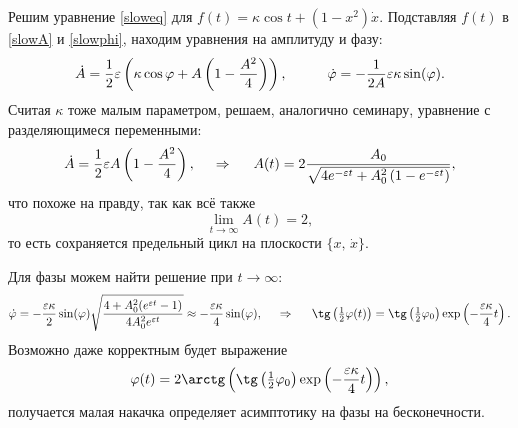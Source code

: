 Решим уравнение \eqref{sloweq} для $f(t) = \kappa \cos t + (1-x^2) \dot{x}$. Подставляя $f(t)$ в \eqref{slowA} и \eqref{slowphi}, находим
уравнения на амплитуду и фазу:
\begin{equation*}
    \dot{A} = \frac{1}{2} \varepsilon \left(\kappa \cos \varphi + A \left(1-\frac{A^2}{4}\right) \right),
    \hspace{10 mm} 
    \dot{\varphi} = - \frac{1}{2A} \varepsilon \kappa \sin(\varphi).
\end{equation*}
Считая $\kappa$ тоже малым параметром, решаем, аналогично семинару, уравнение с разделяющимеся переменными:
\begin{equation*}
    \dot{A} = \frac{1}{2}\varepsilon A \left(1 - \frac{A^2}{4}\right),
    \hspace{0.5cm} \Rightarrow \hspace{0.5cm} 
    A(t) = 2 \frac{A_0}{\sqrt{ 4 e^{-\varepsilon t} + A_0^2\left(1 -  e^{-\varepsilon t}\right)}},
\end{equation*}
что похоже на правду, так как всё также
\begin{equation*}
    \lim_{t\to \infty} A(t) = 2,
\end{equation*}
то есть сохраняется предельный цикл на плоскости $\{x,\, \dot{x}\}$. 

Для фазы можем найти решение при $t\to \infty$:
\begin{equation*}
    \dot{\varphi} = -\frac{\varepsilon \kappa}{2} \sin(\varphi) \sqrt{\frac{4 + A_0^2 (e^{\varepsilon t} - 1)}{4 A_0^2 e^{\varepsilon t}}} \approx  - \frac{\varepsilon \kappa}{4} \sin(\varphi),
    \hspace{0.5cm} \Rightarrow \hspace{0.5cm}
    \tg\left(\tfrac{1}{2}\varphi(t)\right) = \tg\left(\tfrac{1}{2}\varphi_0\right)\exp\left(- \frac{\varepsilon \kappa}{4} t\right).
\end{equation*}
Возможно даже корректным будет выражение
\begin{equation*}
    \varphi(t) = 2 \arctg\left(\tg\left(\tfrac{1}{2}\varphi_0\right) \exp\left(- \frac{\varepsilon \kappa}{4} t\right)\right),
\end{equation*}
получается малая накачка определяет асимптотику на фазы на бесконечности.




